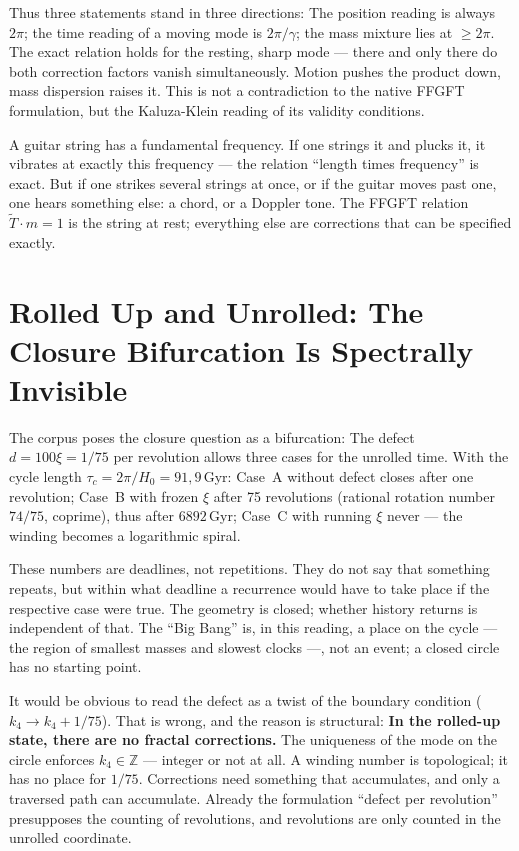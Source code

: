 Thus three statements stand in three directions: The position reading is
always $2\pi$; the time reading of a moving mode is $2\pi/\gamma$;
the mass mixture lies at $\ge2\pi$. The exact relation holds for the
resting, sharp mode --- there and only there do both
correction factors vanish simultaneously. Motion pushes the product down,
mass dispersion raises it. This is not a contradiction to the native
FFGFT formulation, but the Kaluza-Klein reading of its
validity conditions.

\begin{laierspur}
A guitar string has a fundamental frequency. If one
strings it and plucks it, it vibrates at exactly this frequency --- the relation
\enquote{length times frequency} is exact. But if one strikes several strings
at once, or if the guitar moves past one, one hears something else: a chord, or a Doppler tone. The FFGFT relation
$\tilde T\cdot m = 1$ is the string at rest; everything else are
corrections that can be specified exactly.
\end{laierspur}

\section{Rolled Up and Unrolled: The Closure Bifurcation Is Spectrally Invisible}

The corpus poses the closure question as a bifurcation: The defect
$d = 100\xi = 1/75$ per revolution allows three cases for the unrolled time.
With the cycle length $\tau_c = 2\pi/H_0 = 91{,}9$\,Gyr: Case~A without
defect closes after one revolution; Case~B with frozen $\xi$ after
75 revolutions (rational rotation number $74/75$, coprime), thus after
$6892$\,Gyr; Case~C with running $\xi$ never --- the winding becomes a
logarithmic spiral.

These numbers are deadlines, not repetitions. They do not say that
something repeats, but within what deadline a recurrence would have to
take place if the respective case were true. The geometry is closed;
whether history returns is independent of that. The
\enquote{Big Bang} is, in this reading, a place on the cycle --- the
region of smallest masses and slowest clocks ---, not an event; a
closed circle has no starting point.

It would be obvious to read the defect as a twist of the boundary condition
($k_4\to k_4+1/75$). That is wrong, and the reason is structural:
\textbf{In the rolled-up state, there are no fractal corrections.}
The uniqueness of the mode on the circle enforces $k_4\in\mathbb{Z}$
--- integer or not at all. A winding number is topological; it
has no place for $1/75$. Corrections need something that
accumulates, and only a traversed path can accumulate. Already the
formulation \enquote{defect per revolution} presupposes the counting of
revolutions, and revolutions are only counted in the unrolled coordinate.

